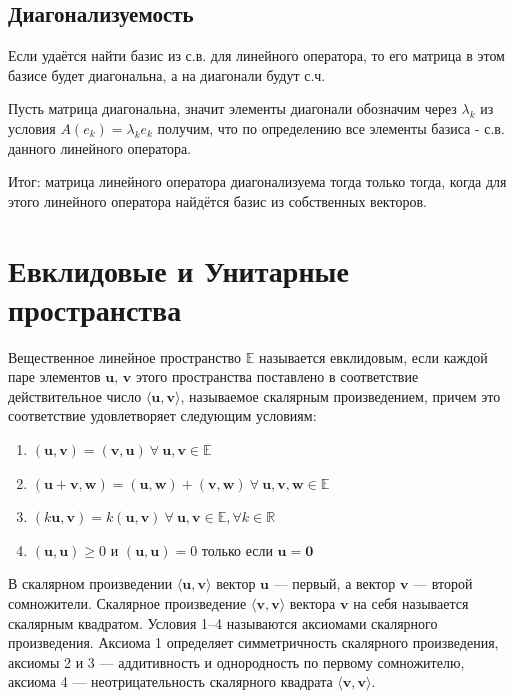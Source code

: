 \documentclass[12pt]{article}
\begin{document}
\subsection{Диагонализуемость}

Если удаётся найти базис из с.в. для линейного оператора, то его матрица в этом базисе будет диагональна, а на диагонали будут с.ч.

Пусть матрица диагональна, значит элементы диагонали обозначим через $\lambda_k$ из условия $A(e_k) = \lambda_k e_k$ получим, что по определению все элементы базиса - с.в. данного линейного оператора.

Итог: матрица линейного оператора диагонализуема тогда только тогда, когда для этого линейного оператора найдётся базис из собственных векторов.

\section{Евклидовые и Унитарные пространства}
Вещественное линейное пространство $\mathbb{E}$ называется евклидовым, если каждой паре элементов $\mathbf{u},\,\mathbf{v}$ этого пространства поставлено в соответствие действительное число $\langle \mathbf{u},\mathbf{v} \rangle$, называемое скалярным произведением, причем это соответствие удовлетворяет следующим условиям:
\begin{enumerate}
    \item $(\mathbf{u},\mathbf{v})=(\mathbf{v},\mathbf{u})\ \forall\ \mathbf{u},\mathbf{v}\in \mathbb{E}$
    \item $(\mathbf{u} + \mathbf{v},\mathbf{w})=(\mathbf{u},\mathbf{w})+(\mathbf{v},\mathbf{w})\ \forall\ \mathbf{u},\mathbf{v},\mathbf{w}\in \mathbb{E}$
    \item $(k\mathbf{u},\mathbf{v})=k(\mathbf{u},\mathbf{v})\ \forall\ \mathbf{u},\mathbf{v}\in \mathbb{E},\forall k\in \mathbb{R}$
    \item $(\mathbf{u},\mathbf{u})\geq 0$ и $(\mathbf{u},\mathbf{u})=0$ только если $\mathbf{u}=\mathbf{0}$
\end{enumerate}
В скалярном произведении $\langle\mathbf{u}, \mathbf{v}\rangle$ вектор $\mathbf{u}$ — первый, а вектор $\mathbf{v}$ — второй сомножители. Скалярное произведение $\langle\mathbf{v},\mathbf{v}\rangle$ вектора $\mathbf{v}$ на себя называется скалярным квадратом. Условия 1–4 называются аксиомами скалярного произведения. Аксиома 1 определяет симметричность скалярного произведения, аксиомы 2 и 3 — аддитивность и однородность по первому сомножителю, аксиома 4 — неотрицательность скалярного квадрата $\langle\mathbf{v}, \mathbf{v}\rangle$.
\end{document}
